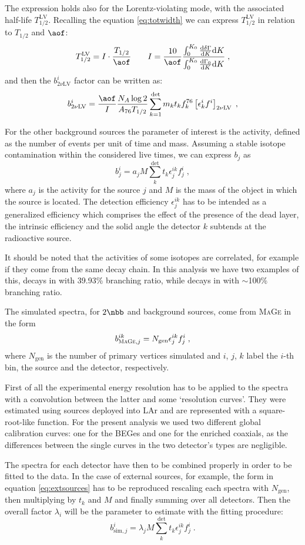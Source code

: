 The expression holds also for the Lorentz-violating mode, with the associated half-life $T_{1/2}^\text{LV}$. Recalling the equation \ref{eq:totwidth} we can express $T_{1/2}^\text{LV}$ in relation to $T_{1/2}$ and $\aof$:
\[T_{1/2}^\text{LV}=I\cdot\frac{T_{1/2}}{\aof}\qquad I=\frac{10}{\aof}\frac{\int_0^{K_0}\frac{\text{d}\delta\Gamma}{\text{d}K}\text{d}K}{\int_0^{K_0}\frac{\text{d}\Gamma_0}{\text{d}K}\text{d}K}\;,\]
and then the $b_{2\nu\text{LV}}^i$ factor can be written as:
\[b_{2\nu\text{LV}}^i=\frac{\aof}{I}\frac{N_A\log2}{A_{76}T_{1/2}}\sum_{k=1}^\text{det}m_kt_kf^{76}_k\left[\epsilon^i_kf^i\right]_{2\nu\text{LV}}\;,\]

 For the other background sources the parameter of interest is the activity, defined as the number of events per unit of time and mass. Assuming a stable isotope contamination within the considered live times, we can express $b_j$ as
\[b_j^i=a_jM\sum_k^\text{det}t_k\epsilon_j^{ik}f_j^i\;,\label{eq:extsources}\]
where $a_j$ is the activity for the source $j$ and $M$ is the mass of the object in which the source is located. The detection efficiency $\epsilon_j^{ik}$ has to be intended as a generalized efficiency which comprises the effect of the presence of the dead layer, the intrinsic efficiency and the solid angle the detector $k$ subtends at the radioactive source.

It should be noted that the activities of some isotopes are correlated, for example if they come from the same decay chain. In this analysis we have two examples of this,  decays in  with 39.93\% branching ratio, while  decays in  with $\sim$100\% branching ratio.

 The simulated spectra, for $2\nbb$ and background sources, come from \textsc{MaGe} in the form
\[b^{ik}_{\textsc{MaGe},j}=N_\text{gen}\epsilon^{ik}_jf_j^i\;,\]
where $N_\text{gen}$ is the number of primary vertices simulated and $i$, $j$, $k$ label the $i$-th bin, the source and the detector, respectively.

First of all the experimental energy resolution has to be applied to the spectra with a convolution between the latter and some `resolution curves'. They were estimated using  sources deployed into LAr and are represented with a square-root-like function. For the present analysis we used two different global calibration curves: one for the BEGes and one for the enriched coaxials, as the differences between the single curves in the two detector's types are negligible.

The spectra for each detector have then to be combined properly in order to be fitted to the data. In the case of external sources, for example, the form in equation \ref{eq:extsources} has to be reproduced rescaling each spectra with $N_\text{gen}$, then multiplying by $t_k$ and $M$ and finally summing over all detectors. Then the overall factor $\lambda_i$ will be the parameter to estimate with the fitting procedure:
\[b_{\text{sim},j}^i=\lambda_jM\sum_k^\text{det}t_k\epsilon_j^{ik}f_j^i\;.\]


